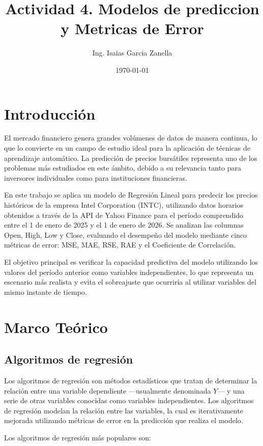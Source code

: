 \documentclass[12pt]{article}
\title{Actividad 4. Modelos de prediccion y Metricas de Error}
\author{Ing. Isaias Garcia Zanella}
\date{\today}
\begin{document}
\maketitle

\section{Introducción}
El mercado financiero genera grandes volúmenes de datos de manera continua, 
lo que lo convierte en un campo de estudio ideal para la aplicación de 
técnicas de aprendizaje automático. La predicción de precios bursátiles 
representa uno de los problemas más estudiados en este ámbito, debido a 
su relevancia tanto para inversores individuales como para instituciones 
financieras.

En este trabajo se aplica un modelo de Regresión Lineal para predecir 
los precios históricos de la empresa Intel Corporation (INTC), utilizando 
datos horarios obtenidos a través de la API de Yahoo Finance para el 
período comprendido entre el 1 de enero de 2025 y el 1 de enero de 2026. 
Se analizan las columnas Open, High, Low y Close, evaluando el desempeño 
del modelo mediante cinco métricas de error: MSE, MAE, RSE, RAE y el 
Coeficiente de Correlación.

El objetivo principal es verificar la capacidad predictiva del modelo 
utilizando los valores del período anterior como variables independientes, 
lo que representa un escenario más realista y evita el sobreajuste que 
ocurriría al utilizar variables del mismo instante de tiempo.
\section{Marco Teórico}
\subsection{Algoritmos de regresión}
Los algoritmos de regresión son métodos estadísticos que tratan de determinar la relación entre una variable dependiente —usualmente denominada $Y$— y una serie de otras variables conocidas como variables independientes. 
Los algoritmos de regresión modelan la relación entre las variables, la cual es iterativamente mejorada utilizando métricas de error en la predicción que realiza el modelo.

Los algoritmos de regresión más populares son:
\end{document}
